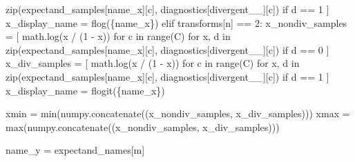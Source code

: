 \documentclass[
  letterpaper,
  DIV=11,
  numbers=noendperiod]{scrartcl}
\newenvironment{Shaded}{\begin{snugshade}}{\end{snugshade}}
\newcommand{\BuiltInTok}[1]{\textcolor[rgb]{0.00,0.23,0.31}{#1}}
\newcommand{\ControlFlowTok}[1]{\textcolor[rgb]{0.00,0.23,0.31}{#1}}
\newcommand{\DecValTok}[1]{\textcolor[rgb]{0.68,0.00,0.00}{#1}}
\newcommand{\KeywordTok}[1]{\textcolor[rgb]{0.00,0.23,0.31}{#1}}
\newcommand{\NormalTok}[1]{\textcolor[rgb]{0.00,0.23,0.31}{#1}}
\newcommand{\OperatorTok}[1]{\textcolor[rgb]{0.37,0.37,0.37}{#1}}
\newcommand{\SpecialCharTok}[1]{\textcolor[rgb]{0.37,0.37,0.37}{#1}}
\newcommand{\SpecialStringTok}[1]{\textcolor[rgb]{0.13,0.47,0.30}{#1}}
\newcommand{\StringTok}[1]{\textcolor[rgb]{0.13,0.47,0.30}{#1}}
\begin{document}
\begin{Shaded}
\begin{Highlighting}[]
                          \BuiltInTok{zip}\NormalTok{(expectand\_samples[name\_x][c], }
\NormalTok{                              diagnostics[}\StringTok{\textquotesingle{}divergent\_\_\textquotesingle{}}\NormalTok{][c]) }
                          \ControlFlowTok{if}\NormalTok{ d }\OperatorTok{==} \DecValTok{1}\NormalTok{  ]}
\NormalTok{        x\_display\_name }\OperatorTok{=} \SpecialStringTok{f\textquotesingle{}log(}\SpecialCharTok{\{}\NormalTok{name\_x}\SpecialCharTok{\}}\SpecialStringTok{)\textquotesingle{}}
      \ControlFlowTok{elif}\NormalTok{ transforms[n] }\OperatorTok{==} \DecValTok{2}\NormalTok{:}
\NormalTok{        x\_nondiv\_samples }\OperatorTok{=}\NormalTok{ [ math.log(x }\OperatorTok{/}\NormalTok{ (}\DecValTok{1} \OperatorTok{{-}}\NormalTok{ x)) }
                             \ControlFlowTok{for}\NormalTok{ c }\KeywordTok{in} \BuiltInTok{range}\NormalTok{(C) }\ControlFlowTok{for}\NormalTok{ x, d }\KeywordTok{in} 
                             \BuiltInTok{zip}\NormalTok{(expectand\_samples[name\_x][c], }
\NormalTok{                                 diagnostics[}\StringTok{\textquotesingle{}divergent\_\_\textquotesingle{}}\NormalTok{][c]) }
                             \ControlFlowTok{if}\NormalTok{ d }\OperatorTok{==} \DecValTok{0}\NormalTok{  ]}
\NormalTok{        x\_div\_samples }\OperatorTok{=}\NormalTok{ [ math.log(x }\OperatorTok{/}\NormalTok{ (}\DecValTok{1} \OperatorTok{{-}}\NormalTok{ x)) }
                          \ControlFlowTok{for}\NormalTok{ c }\KeywordTok{in} \BuiltInTok{range}\NormalTok{(C) }\ControlFlowTok{for}\NormalTok{ x, d }\KeywordTok{in} 
                          \BuiltInTok{zip}\NormalTok{(expectand\_samples[name\_x][c], }
\NormalTok{                              diagnostics[}\StringTok{\textquotesingle{}divergent\_\_\textquotesingle{}}\NormalTok{][c]) }
                          \ControlFlowTok{if}\NormalTok{ d }\OperatorTok{==} \DecValTok{1}\NormalTok{  ]}
\NormalTok{        x\_display\_name }\OperatorTok{=} \SpecialStringTok{f\textquotesingle{}logit(}\SpecialCharTok{\{}\NormalTok{name\_x}\SpecialCharTok{\}}\SpecialStringTok{)\textquotesingle{}}
        
\NormalTok{      xmin }\OperatorTok{=} \BuiltInTok{min}\NormalTok{(numpy.concatenate((x\_nondiv\_samples, x\_div\_samples)))}
\NormalTok{      xmax }\OperatorTok{=} \BuiltInTok{max}\NormalTok{(numpy.concatenate((x\_nondiv\_samples, x\_div\_samples)))}
      
\NormalTok{      name\_y }\OperatorTok{=}\NormalTok{ expectand\_names[m]}
      

\end{Highlighting}
\end{Shaded}
\end{document}
